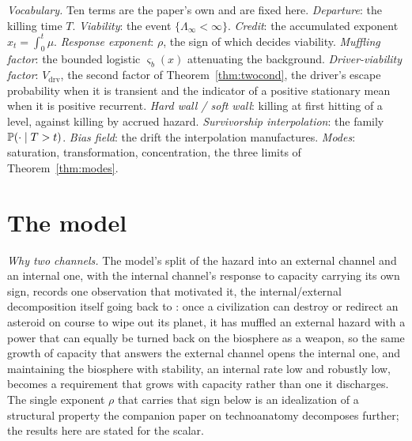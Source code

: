 \emph{Vocabulary.} Ten terms are the paper's own and are fixed here.
\emph{Departure}: the killing time $T$. \emph{Viability}: the event
$\{\Lambda_\infty<\infty\}$. \emph{Credit}: the accumulated exponent
$x_t=\int_0^t\mu$. \emph{Response exponent}: $\rho$, the sign of
which decides viability. \emph{Muffling factor}: the bounded logistic
$\varsigma_b(x)$ attenuating the background. \emph{Driver-viability factor}:
$V_{\mathrm{drv}}$, the second factor of Theorem~\ref{thm:twocond},
the driver's escape probability when it is transient and the indicator
of a positive stationary mean when it is positive recurrent. \emph{Hard wall / soft wall}: killing at
first hitting of a level, against killing by accrued hazard.
\emph{Survivorship interpolation}: the family
$\mathbb{P}(\cdot\mid T>t)$. \emph{Bias field}: the drift the interpolation
manufactures. \emph{Modes}: saturation, transformation, concentration,
the three limits of Theorem~\ref{thm:modes}.

\section{The model}\label{sec:model}

\noindent\textit{Why two channels.} The model's split of the hazard into an external channel and an internal one, with the internal channel's response to capacity carrying its own sign, records one observation that motivated it, the internal/external decomposition itself going back to \cite{GoldenScience2022}: once a civilization can destroy or redirect an asteroid on course to wipe out its planet, it has muffled an external hazard with a power that can equally be turned back on the biosphere as a weapon, so the same growth of capacity that answers the external channel opens the internal one, and maintaining the biosphere with stability, an internal rate low and robustly low, becomes a requirement that grows with capacity rather than one it discharges. The single exponent $\rho$ that carries that sign below is an idealization of a structural property the companion paper on technoanatomy decomposes further; the results here are stated for the scalar.


